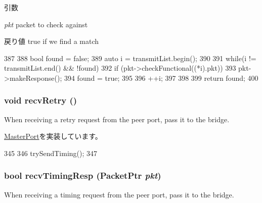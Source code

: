 \begin{DoxyParams}{引数}
\item[{\em pkt}]packet to check against\end{DoxyParams}
\begin{DoxyReturn}{戻り値}
true if we find a match 
\end{DoxyReturn}



\begin{DoxyCode}
387 {
388     bool found = false;
389     auto i = transmitList.begin();
390 
391     while(i != transmitList.end() && !found) {
392         if (pkt->checkFunctional((*i).pkt)) {
393             pkt->makeResponse();
394             found = true;
395         }
396         ++i;
397     }
398 
399     return found;
400 }
\end{DoxyCode}
\hypertarget{classBridge_1_1BridgeMasterPort_a29cb5a4f98063ce6e9210eacbdb35298}{
\subsubsection[{recvRetry}]{\setlength{\rightskip}{0pt plus 5cm}void recvRetry ()}}
\label{classBridge_1_1BridgeMasterPort_a29cb5a4f98063ce6e9210eacbdb35298}
When receiving a retry request from the peer port, pass it to the bridge. 

\hyperlink{classMasterPort_ac1ccc3bcf7ebabb20b57fab99b2be5b0}{MasterPort}を実装しています。


\begin{DoxyCode}
345 {
346     trySendTiming();
347 }
\end{DoxyCode}
\hypertarget{classBridge_1_1BridgeMasterPort_a482dba5588f4bee43e498875a61e5e0b}{
\subsubsection[{recvTimingResp}]{\setlength{\rightskip}{0pt plus 5cm}bool recvTimingResp ({\bf PacketPtr} {\em pkt})}}
\label{classBridge_1_1BridgeMasterPort_a482dba5588f4bee43e498875a61e5e0b}
When receiving a timing request from the peer port, pass it to the bridge. 


